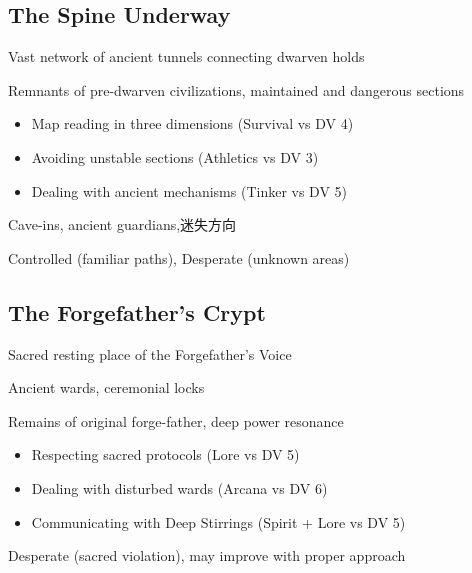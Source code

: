 \documentclass[11pt]{article}
\newenvironment{location}[1]{\begin{description}[leftmargin=*,style=standard]\item[\textbf{#1}]}{\end{description}}
\begin{document}
\subsection{The Spine Underway}
\begin{location}{The Spine Underway}
\item[Description:] Vast network of ancient tunnels connecting dwarven holds
\item[Features:] Remnants of pre-dwarven civilizations, maintained and dangerous sections
\item[Navigation Challenges:] 
  \begin{itemize}
    \item Map reading in three dimensions (Survival vs DV 4)
    \item Avoiding unstable sections (Athletics vs DV 3)
    \item Dealing with ancient mechanisms (Tinker vs DV 5)
  \end{itemize}
\item[Dangers:] Cave-ins, ancient guardians,迷失方向
\item[Position:] Controlled (familiar paths), Desperate (unknown areas)
\end{location}

\subsection{The Forgefather's Crypt}
\begin{location}{The Forgefather's Crypt}
\item[Description:] Sacred resting place of the Forgefather's Voice
\item[Protection:] Ancient wards, ceremonial locks
\item[Features:] Remains of original forge-father, deep power resonance
\item[Challenges:] 
  \begin{itemize}
    \item Respecting sacred protocols (Lore vs DV 5)
    \item Dealing with disturbed wards (Arcana vs DV 6)
    \item Communicating with Deep Stirrings (Spirit + Lore vs DV 5)
  \end{itemize}
\item[Position:] Desperate (sacred violation), may improve with proper approach
\end{location}
\end{document}

